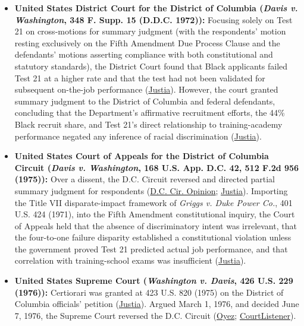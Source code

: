 \documentclass[12pt]{article}
\begin{document}
\begin{itemize}
\item \textbf{United States District Court for the District of Columbia (\textit{Davis v. Washington}, 348 F. Supp. 15 (D.D.C. 1972)):} Focusing solely on Test 21 on cross-motions for summary judgment (with the respondents' motion resting exclusively on the Fifth Amendment Due Process Clause and the defendants' motions asserting compliance with both constitutional and statutory standards), the District Court found that Black applicants failed Test 21 at a higher rate and that the test had not been validated for subsequent on-the-job performance (\href{https://supreme.justia.com/cases/federal/us/426/229/}{Justia}). However, the court granted summary judgment to the District of Columbia and federal defendants, concluding that the Department's affirmative recruitment efforts, the 44\% Black recruit share, and Test 21's direct relationship to training-academy performance negated any inference of racial discrimination (\href{https://supreme.justia.com/cases/federal/us/426/229/}{Justia}).
\item \textbf{United States Court of Appeals for the District of Columbia Circuit (\textit{Davis v. Washington}, 168 U.S. App. D.C. 42, 512 F.2d 956 (1975)):} Over a dissent, the D.C. Circuit reversed and directed partial summary judgment for respondents (\href{https://law.justia.com/cases/federal/appellate-courts/F2/512/956/286050/}{D.C. Cir. Opinion}; \href{https://supreme.justia.com/cases/federal/us/426/229/}{Justia}). Importing the Title VII disparate-impact framework of \textit{Griggs v. Duke Power Co.}, 401 U.S. 424 (1971), into the Fifth Amendment constitutional inquiry, the Court of Appeals held that the absence of discriminatory intent was irrelevant, that the four-to-one failure disparity established a constitutional violation unless the government proved Test 21 predicted actual job performance, and that correlation with training-school exams was insufficient (\href{https://supreme.justia.com/cases/federal/us/426/229/}{Justia}).
\item \textbf{United States Supreme Court (\textit{Washington v. Davis}, 426 U.S. 229 (1976)):} Certiorari was granted at 423 U.S. 820 (1975) on the District of Columbia officials' petition (\href{https://supreme.justia.com/cases/federal/us/426/229/}{Justia}). Argued March 1, 1976, and decided June 7, 1976, the Supreme Court reversed the D.C. Circuit (\href{https://www.oyez.org/cases/1975/74-1492}{Oyez}; \href{https://www.courtlistener.com/opinion/109469/washington-v-davis/}{CourtListener}).
\end{itemize}
\end{document}
